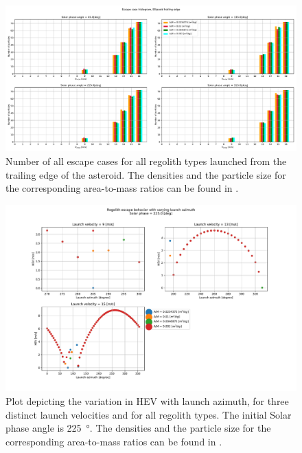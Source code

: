\begin{figure}[htb]
\centering
\captionsetup{justification=centering}
\includegraphics[angle=90, width=\textwidth, height=\textheight, keepaspectratio=true]{trailing_edge_perturbations/allEscapeCases.pdf}
\caption{Number of all escape cases for all regolith types launched from the trailing edge of the asteroid. The densities and the particle size for the corresponding area-to-mass ratios can be found in .}
\label{fig:trailingEdge_allParticles_escape_hist}
\end{figure}
\FloatBarrier
\begin{figure}[htb]
\centering
\captionsetup{justification=centering}
\includegraphics[width=\textwidth, height=0.7\textheight, keepaspectratio=true]{trailing_edge_perturbations/hev_solarPhase225.pdf}
\caption{Plot depicting the variation in \gls{HEV} with launch azimuth, for three distinct launch velocities and for all regolith types. The initial Solar phase angle is \SI{225}{\degree}. The densities and the particle size for the corresponding area-to-mass ratios can be found in .}
\label{fig:trailingEdge_hev_solarPhase225}
\end{figure}
